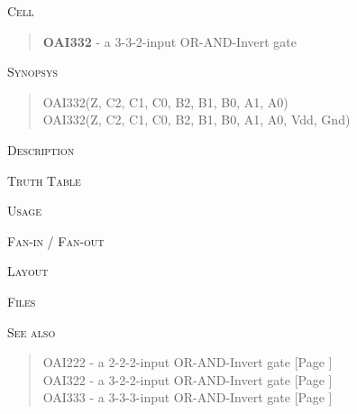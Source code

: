
\label{OAI332}
\textsc{Cell}
\begin{quote}
    \textbf{OAI332} - a 3-3-2-input OR-AND-Invert gate
\end{quote}

\textsc{Synopsys}
\begin{quote}
    OAI332(Z, C2, C1, C0, B2, B1, B0, A1, A0) \\
    OAI332(Z, C2, C1, C0, B2, B1, B0, A1, A0, Vdd, Gnd)
\end{quote}

\textsc{Description}

%

\textsc{Truth Table}


\textsc{Usage}

\textsc{Fan-in / Fan-out}

\textsc{Layout}

\textsc{Files}

\textsc{See also}
\begin{quote}
    OAI222 - a 2-2-2-input OR-AND-Invert gate [Page \pageref{OAI222}] \\
    OAI322 - a 3-2-2-input OR-AND-Invert gate [Page \pageref{OAI322}] \\
    OAI333 - a 3-3-3-input OR-AND-Invert gate [Page \pageref{OAI333}]
\end{quote}
